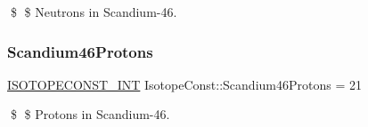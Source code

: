 \$ \$ Neutrons in Scandium-\/46. \mbox{\label{group___isotope_const-_scandium-_sc46_ga2f90bd7495f7b4bae85d42505445a7b9}} 
\subsubsection{\texorpdfstring{Scandium46\+Protons}{Scandium46Protons}}
{\footnotesize\ttfamily \mbox{\hyperlink{group___isotope_const-_macros_ga5f18360b3e99483a35c32d789e62621c}{I\+S\+O\+T\+O\+P\+E\+C\+O\+N\+S\+T\+\_\+\+I\+NT}} Isotope\+Const\+::\+Scandium46\+Protons = 21}

\$ \$ Protons in Scandium-\/46. 